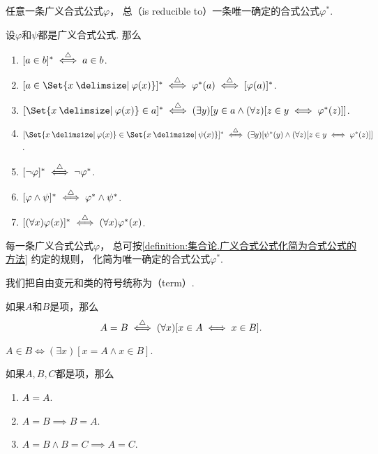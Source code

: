 任意一条广义合式公式\(\varphi\)，
总（is reducible to）一条唯一确定的合式公式\(\varphi^*\).
\begin{definition}\label{definition:集合论.广义合式公式化简为合式公式的方法}
设\(\varphi\)和\(\psi\)都是广义合式公式.
\def\A{\Set{ x \given \varphi(x) }}
\def\B{\Set{ x \given \psi(x) }}
那么\begin{enumerate}
	\item \([a \in b]^* \overset{\triangle}{\iff} a \in b\).
	\item \([a \in \A]^* \defiff \varphi^*(a) \defiff [\varphi(a)]^*\).
	\item \([\A \in a]^* \defiff (\exists y)[y \in a \land (\forall z)[z \in y \iff \varphi^*(z)]]\).
	\item \([\A \in \B]^* \defiff (\exists y)[\psi^*(y) \land (\forall z)[z \in y \iff \varphi^*(z)]]\).
	\item \([\neg\varphi]^* \overset{\triangle}{\iff} \neg\varphi^*\).
	\item \([\varphi\land\psi]^* \overset{\triangle}{\iff} \varphi^*\land\psi^*\).
	\item \([(\forall x)\varphi(x)]^* \overset{\triangle}{\iff} (\forall x)\varphi^*(x)\).
\end{enumerate}
\end{definition}

\begin{theorem}
每一条广义合式公式\(\varphi\)，
总可按\cref{definition:集合论.广义合式公式化简为合式公式的方法} 约定的规则，
化简为唯一确定的合式公式\(\varphi^*\).
\end{theorem}

我们把自由变元和类的符号统称为（term）.
\begin{definition}
如果\(A\)和\(B\)是项，那么\[
	A=B \overset{\triangle}{\iff} (\forall x)[x \in A \iff x \in B].
\]
\end{definition}

\begin{theorem}
\(A \in B \iff (\exists x)[x = A \land x \in B]\).
\end{theorem}

\begin{theorem}
如果\(A,B,C\)都是项，那么\begin{enumerate}
	\item \(A=A\).
	\item \(A=B \implies B=A\).
	\item \(A=B \land B=C \implies A=C\).
\end{enumerate}
\end{theorem}

